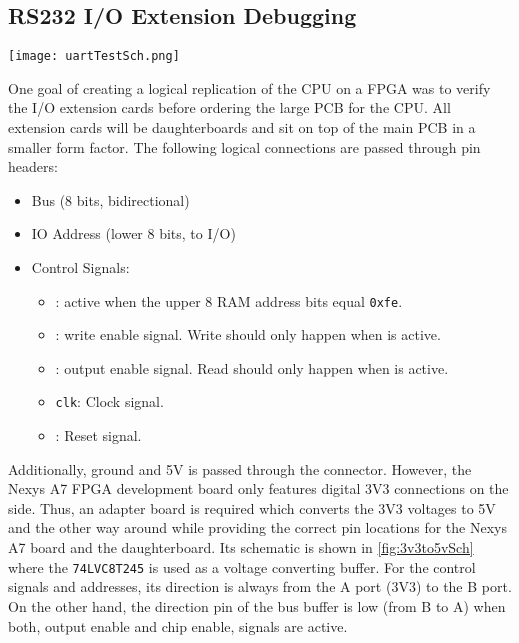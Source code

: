 \subsection{RS232 I/O Extension Debugging}
\begin{sidewaysfigure}[p]
  \centering
  \texttt{[image: uartTestSch.png]}
  \caption{The Schematic for the 3V3 to 5V conversion to use extension cards with the \gls{FPGA} development board.}
  \label{fig:3v3to5vSch}
\end{sidewaysfigure}
One goal of creating a logical replication of the \gls{CPU} on a \gls{FPGA} was to verify the I/O extension cards before ordering the large \gls{PCB} for the \gls{CPU}.
All extension cards will be daughterboards and sit on top of the main \gls{PCB} in a smaller form factor.
The following logical connections are passed through pin headers:
\begin{itemize}
  \item Bus (8 bits, bidirectional)
  \item IO Address (lower 8 bits, to I/O)
  \item Control Signals:
  \begin{itemize}
    \item \texttt{}: active when the upper 8 \gls{RAM} address bits equal \texttt{0xfe}.
    \item \texttt{}: write enable signal. Write should only happen when \texttt{} is active.
    \item \texttt{}: output enable signal. Read should only happen when \texttt{} is active.
    \item \texttt{clk}: Clock signal.
    \item \texttt{}: Reset signal.
  \end{itemize}
\end{itemize}
Additionally, ground and 5V is passed through the connector.
However, the Nexys A7 \gls{FPGA} development board only features digital 3V3 connections on the side.
Thus, an adapter board is required which converts the 3V3 voltages to 5V and the other way around while providing the correct pin locations for the Nexys A7 board and the daughterboard.
Its schematic is shown in \cref{fig:3v3to5vSch} where the \texttt{74LVC8T245} is used as a voltage converting buffer.
For the control signals and addresses, its direction is always from the A port (3V3) to the B port.
On the other hand, the direction pin of the bus buffer is low (from B to A) when both, output enable and chip enable, signals are active.